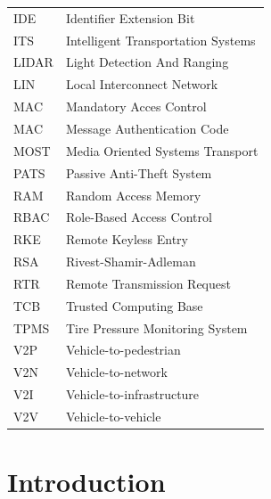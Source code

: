 \documentclass[11pt]{article}
\begin{document}
\begin{tabular}{ l l }
	IDE & Identifier Extension Bit \\
	ITS & Intelligent Transportation Systems \\
	LIDAR & Light Detection And Ranging \\
	LIN & Local Interconnect Network \\
	MAC & Mandatory Acces Control \\
	MAC & Message Authentication Code \\
	MOST & Media Oriented Systems Transport \\
	PATS & Passive Anti-Theft System \\
	RAM & Random Access Memory \\
	RBAC & Role-Based Access Control \\
	RKE & Remote Keyless Entry \\
	RSA & Rivest-Shamir-Adleman \\
	RTR & Remote Transmission Request \\
	TCB & Trusted Computing Base \\
	TPMS & Tire Pressure Monitoring System \\
	V2P & Vehicle-to-pedestrian \\
	V2N & Vehicle-to-network \\
	V2I & Vehicle-to-infrastructure  \\
	V2V & Vehicle-to-vehicle \\
\end{tabular}

\newpage
\tableofcontents

\section{Introduction}
\label{sec:introduction}
\end{document}
